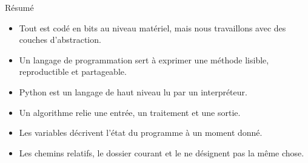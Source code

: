 \documentclass[10pt,aspectratio=169]{beamer}
\begin{document}
\begin{frame}{Résumé}
\begin{itemize}
  \item Tout est codé en bits au niveau matériel, mais nous travaillons avec des couches d’abstraction.
  \item Un langage de programmation sert à exprimer une méthode lisible, reproductible et partageable.
  \item Python est un langage de haut niveau lu par un interpréteur.
  \item Un algorithme relie une entrée, un traitement et une sortie.
  \item Les variables décrivent l’état du programme à un moment donné.
  \item Les chemins relatifs, le dossier courant et le  ne désignent pas la même chose.
\end{itemize}
\end{frame}
\end{document}
